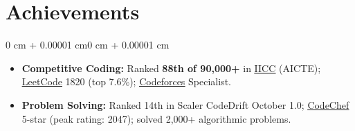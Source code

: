 \documentclass[11pt, letterpaper]{extarticle}
\newenvironment{highlights}{
    \begin{itemize}[
        topsep=0.01 cm,
        parsep=0pt,
        partopsep=0pt,
        itemsep=0pt,
        leftmargin=0 cm + 10pt
    ]
}{
    \end{itemize}
}
\newenvironment{onecolentry}{
    \begin{adjustwidth}{0 cm + 0.00001 cm}{0 cm + 0.00001 cm}
}{
    \end{adjustwidth}
}
\begin{document}
    \section{Achievements}
    \begin{onecolentry}
        \begin{highlights}
            \item \textbf{Competitive Coding:} Ranked \textbf{88th of 90,000+} in \href{https://drive.google.com/file/d/1Uq0hlzBOx3fmnQFqw7mXnZ5fT-cV4JKc/view}{\underline{IICC}} (AICTE); \href{https://leetcode.com/apcode15/}{\underline{LeetCode}} 1820 (top 7.6\%); \href{https://codeforces.com/profile/apcode15}{\underline{Codeforces}} Specialist.
            \item \textbf{Problem Solving:} Ranked 14th in Scaler CodeDrift October 1.0; \href{https://www.codechef.com/users/apcode15}{\underline{CodeChef}} 5-star (peak rating: 2047); solved 2,000+ algorithmic problems.
        \end{highlights}
    \end{onecolentry}
\end{document}
